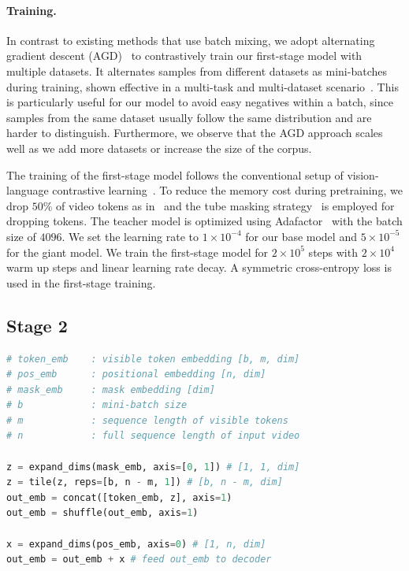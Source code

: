 \documentclass{article}
\theoremstyle{plain}
\theoremstyle{definition}
\theoremstyle{remark}
\begin{document}
\paragraph{Training.} In contrast to existing methods that use batch mixing, we adopt alternating gradient descent (AGD)~\cite{jain2017non} to contrastively train our first-stage model with multiple datasets. It alternates samples from different datasets as mini-batches during training, shown effective in a multi-task and multi-dataset scenario~\cite{akbari2023alternating}. This is particularly useful for our model to avoid easy negatives within a batch, since samples from the same dataset usually follow the same distribution and are harder to distinguish. Furthermore, we observe that the AGD approach scales well as we add more datasets or increase the size of the corpus.

The training of the first-stage model follows the conventional setup of vision-language contrastive learning~\cite{radford2021learning}. To reduce the memory cost during pretraining, we drop $50\%$ of video tokens as in~\citet{li2023scaling} and the tube masking strategy~\cite{feichtenhofer2022masked} is employed for dropping tokens. The teacher model is optimized using Adafactor~\cite{shazeer2018adafactor} with the batch size of $4096$. We set the learning rate to $1 \times 10^{-4}$ for our base model and $5 \times 10^{-5}$ for the giant model. We train the first-stage model for $2 \times 10^5$ steps with $2 \times 10^4$ warm up steps and linear learning rate decay. A symmetric cross-entropy loss \cite{gutmann2010noise,radford2021learning,jia2021scaling,cheng2023vindlu} is used in the first-stage training.








\subsection{Stage 2}

\begin{algorithm}[t]
\caption{Token shuffling pseudo-implementation.}
\newcommand{\hlbox}[1]{\fboxsep=1.2pt\hspace*{-\fboxsep}\colorbox{black!10}{\detokenize{#1}}}
\lstset{style=simple}
\begin{lstlisting}[language=Python]
# token_emb    : visible token embedding [b, m, dim]
# pos_emb      : positional embedding [n, dim]
# mask_emb     : mask embedding [dim]
# b            : mini-batch size
# m            : sequence length of visible tokens
# n            : full sequence length of input video

z = expand_dims(mask_emb, axis=[0, 1]) # [1, 1, dim]
z = tile(z, reps=[b, n - m, 1]) # [b, n - m, dim]
out_emb = concat([token_emb, z], axis=1)
out_emb = shuffle(out_emb, axis=1)

x = expand_dims(pos_emb, axis=0) # [1, n, dim]
out_emb = out_emb + x # feed out_emb to decoder
\end{lstlisting}
\label{alg:shuffle}
\end{algorithm}
\end{document}
